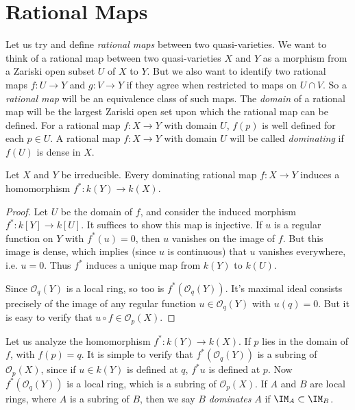 \section{Rational Maps}

Let us try and define \emph{rational maps} between two quasi-varieties. We want to think of a rational map between two quasi-varieties $X$ and $Y$ as a morphism from a Zariski open subset $U$ of $X$ to $Y$. But we also want to identify two rational maps $f: U \to Y$ and $g: V \to Y$ if they agree when restricted to maps on $U \cap V$. So a \emph{rational map} will be an equivalence class of such maps. The \emph{domain} of a rational map will be the largest Zariski open set upon which the rational map can be defined. For a rational map $f: X \to Y$ with domain $U$, $f(p)$ is well defined for each $p \in U$. A rational map $f: X \to Y$ with domain $U$ will be called \emph{dominating} if $f(U)$ is dense in $X$.

\begin{lemma}
    Let $X$ and $Y$ be irreducible. Every dominating rational map $f: X \to Y$ induces a homomorphism $f^*: k(Y) \to k(X)$.
\end{lemma}
\begin{proof}
    Let $U$ be the domain of $f$, and consider the induced morphism $f^*: k[Y] \to k[U]$. It suffices to show this map is injective. If $u$ is a regular function on $Y$ with $f^*(u) = 0$, then $u$ vanishes on the image of $f$. But this image is dense, which implies (since $u$ is continuous) that $u$ vanishes everywhere, i.e. $u = 0$. Thus $f^*$ induces a unique map from $k(Y)$ to $k(U)$.

    Since $\mathcal{O}_q(Y)$ is a local ring, so too is $f^*(\mathcal{O}_q(Y))$. It's maximal ideal consists precisely of the image of any regular function $u \in \mathcal{O}_q(Y)$ with $u(q) = 0$. But it is easy to verify that $u \circ f \in \mathcal{O}_p(X)$.
\end{proof}

Let us analyze the homomorphism $f^*: k(Y) \to k(X)$. If $p$ lies in the domain of $f$, with $f(p) = q$. It is simple to verify that $f^*(\mathcal{O}_q(Y))$ is a subring of $\mathcal{O}_p(X)$, since if $u \in k(Y)$ is defined at $q$, $f^*u$ is defined at $p$. Now $f^*(\mathcal{O}_q(Y))$ is a local ring, which is a subring of $\mathcal{O}_p(X)$. If $A$ and $B$ are local rings, where $A$ is a subring of $B$, then we say $B$ \emph{dominates} $A$ if $\IM_A \subset \IM_B$.

